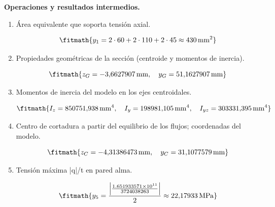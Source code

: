 \noindent\textbf{Operaciones y resultados intermedios.}

\begin{enumerate}

\item Área equivalente que soporta tensión axial.

\[\fitmath{y_{1}=2\cdot 60+2\cdot 110+2\cdot 45\approx 430\,\mathrm{mm^{2}}}\]

\item Propiedades geométricas de la sección (centroide y momentos de inercia).

\[\fitmath{z_G=-3{,}6627907\,\mathrm{mm},\quad y_G=51{,}1627907\,\mathrm{mm}}\]

\item Momentos de inercia del modelo en los ejes centroidales.

\[\fitmath{I_z=850751{,}938\,\mathrm{mm}^{4},\quad I_y=198981{,}105\,\mathrm{mm}^{4},\quad I_{yz}=303331{,}395\,\mathrm{mm}^{4}}\]

\item Centro de cortadura a partir del equilibrio de los flujos; coordenadas del modelo.

\[\fitmath{z_C=-4{,}31386473\,\mathrm{mm},\quad y_C=31{,}1077579\,\mathrm{mm}}\]

\item Tensión máxima |q|/t en pared alma.

\[\fitmath{y_{5}=\frac{\left|\frac{1.651933571\times10^{11}}{3724038263}\right|}{2}\approx 22{,}17933\,\mathrm{MPa}}\]

\end{enumerate}
